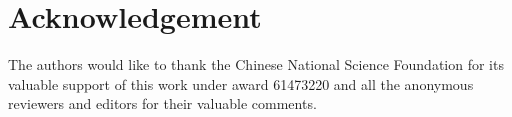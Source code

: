 \documentclass[preprint,12pt]{elsarticle}
\begin{document}






\section*{Acknowledgement}
The authors would like to thank the Chinese National Science Foundation for its valuable support of this work under award 61473220 and all the anonymous reviewers and editors for their valuable comments.



\end{document}
